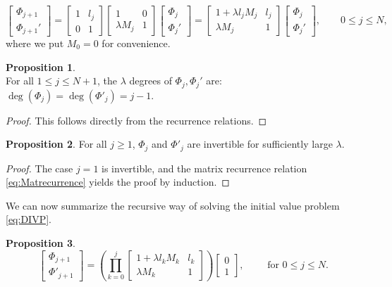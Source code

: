 \documentclass[10pt,a4paper]{article}
\numberwithin{equation}{section}
\theoremstyle{plain}
\theoremstyle{definition}
\newtheorem{proposition}[proposition]{Proposition}
\renewcommand{\l}{\lambda}
\begin{document}
\begin{equation} \label{eq:Matrecurrence}
\begin{bmatrix}\Phi_{j+1}\\ \Phi_{j+1}' \end{bmatrix}=\begin{bmatrix} 1&l_j\\0&1\end{bmatrix}\begin{bmatrix} 1&0\\\l M_j&1 \end{bmatrix} \begin{bmatrix} \Phi_j\\\Phi_j' \end{bmatrix}=\begin{bmatrix}1+\l l_j M_j&l_j\\\l M_j&1 \end{bmatrix} 
\begin{bmatrix} \Phi_j\\\Phi_j' \end{bmatrix} ,   \qquad 0\leq j\leq N, 
\end{equation} 
where we put $M_0=0$ for convenience.  
\begin{proposition}\label{prop:degrees}
\mbox{}\\
 For all $1\leq j\leq N+1$, the $\lambda$ degrees of $\Phi_j, \Phi_j'$  are: $\deg(\Phi_{j})=\deg(\Phi'_j)=j-1$.  

\end{proposition}
\begin{proof}
This follows directly from the recurrence relations.  
\end{proof}
\begin{proposition}\label{prop:inv}
For all $j\geq 1$, $\Phi_j$ and $\Phi'_j$ are invertible for sufficiently large
$\lambda$.  
\end{proposition}
\begin{proof}
The case $j=1$ is invertible, and the matrix recurrence relation \eqref{eq:Matrecurrence}  yields the proof by induction.  

\end{proof}
We can now summarize the recursive way of solving 
the initial value problem \eqref{eq:DIVP}.  
\begin{proposition}

\begin{equation}
\begin{bmatrix}\Phi_{j+1}\\ \Phi'_{j+1}\end{bmatrix}=
\left( \prod_{k=0}^{j}\begin{bmatrix}1+\lambda l_kM_k&l_k\\ \lambda M_k&1 \end{bmatrix}\right)\begin{bmatrix}0\\ 1\end{bmatrix}, \qquad \text{ for } 0\leq j\leq N.  
\end{equation}
\end{proposition}
\end{document}
